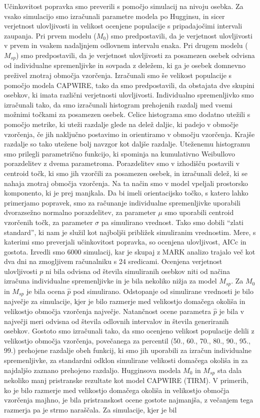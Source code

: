 Učinkovitost popravka smo preverili s pomočjo simulacij na nivoju osebka. Za vsako simulacijo smo izračunali parametre modela po Hugginsu, in sicer verjetnost ulovljivosti in velikost ocenjene populacije s pripadajočimi intervali zaupanja. Pri prvem modelu ($M_0$) smo predpostavili, da je verjetnost ulovljivosti v prvem in vsakem nadaljnjem odlovnem intervalu enaka. Pri drugem modelu ($M_{sp}$) smo predpostavili, da je verjetnost ulovljivosti za posamezen osebek odvisna od individualne spremenljivke in sovpada z deležem, ki ga je osebek domnevno preživel znotraj območja vzorčenja. Izračunali smo še velikost populacije s pomočjo modela CAPWIRE, tako da smo predpostavili, da obstajata dve skupini osebkov, ki imata različni verjetnosti ulovljivosti. Individualno spremenljivko smo izračunali tako, da smo izračunali histogram prehojenih razdalj med vsemi možnimi točkami za posamezen osebek. Celice histograma smo dodatno utežili s pomočjo metrike, ki uteži razdalje glede na delež daljic, ki padejo v območje vzorčenja, če jih naključno postavimo in orientiramo v območju vzorčenja. Krajše razdalje so tako utežene bolj navzgor kot daljše razdalje. Uteženemu histogramu smo prilegli parametrično funkcijo, ki spominja na kumulativno Weibullovo porazdelitev z dvema parametroma. Porazdelitev smo v izhodišču postavili v centroid točk, ki smo jih vzorčili za posamezen osebek, in izračunali delež, ki se nahaja znotraj območja vzorčenja. Na ta način smo v model vpeljali prostorsko komponento, ki je prej manjkala. Da bi imeli orientacijsko točko, s katero lahko primerjamo popravek, smo za računanje individualne spremenljivke uporabili dvorazsežno normalno porazdelitev, za parameter $\mu$ smo uporabili centroid vzorčenih točk, za parameter $\sigma$ pa simulirano vrednost. Tako smo dobili ``zlati standard'', ki nam je služil kot najboljši približek simuliranim vrednostim. Mere, s katerimi smo preverjali učinkovitost popravka, so ocenjena ulovljivost, AICc in gostota. Izvedli smo 6000 simulacij, kar je skupaj z MARK analizo trajalo več kot dva dni na zmogljivem računalniku s 24 sredicami. Ocenjena verjetnost ulovljivosti $p$ ni bila odvisna od števila simuliranih osebkov niti od načina izračuna individualne spremenljivke in je bila nekoliko nižja za model $M_{sp}$. Za $M_0$ in $M_{sp}$ je bila ocena $\hat{p}$ pod simulirano. Odstopanje od simulirane vrednosti je bilo največje za simulacije, kjer je bilo razmerje med velikostjo domačega okoliša in velikostjo območja vzorčenja največje. Natančnost ocene parametra $\hat{p}$ je bila v največji meri odvisna od števila odlovnih intervalov in števila generiranih osebkov. Gostoto smo izračunali tako, da smo ocenjeno velikost populacije delili z velikostjo območja vzorčenja, povečanega za percentil (50., 60., 70., 80., 90., 95., 99.) prehojene razdalje obeh funkcij, ki smo jih uporabili za izračun individualne spremenljivke, za standardni odklon simulirane velikosti domačega okoliša in za najdaljšo zaznano prehojeno razdaljo. Hugginsova modela $M_0$ in $M_{sp}$ sta dala nekoliko manj pristranske rezultate kot model CAPWIRE (TIRM). V primerih, ko je bilo razmerje med velikostjo domačega okoliša in velikostjo območja vzorčenja majhno, je bila pristranskost ocene gostote najmanjša, z večanjem tega razmerja pa je strmo naraščala. Za simulacije, kjer je bil 